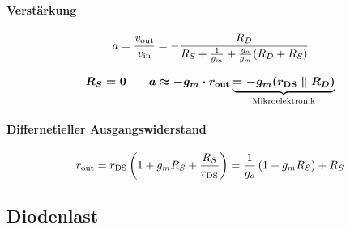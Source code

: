 \smallskip

\paragraph{Verstärkung}

\[
    a = \frac{v_{\rm out}}{v_{\rm in}} = - \frac{R_D}{R_S + \frac{1}{g_m} + \frac{g_o}{g_m}(R_D + R_S)} 
\]

\[
    \boldsymbol{ R_S = 0 \qquad  a \approx - g_m \cdot r_{\rm out} \underbrace{= - g_m (r_{\rm DS} \parallel R_D) }_{\text{Mikroelektronik}} }
\]


\paragraph{Differnetieller Ausgangswiderstand}

\vspace{-0.2cm}

\[
    r_{\rm out} = r_{\rm DS} \left( 1 + g_m R_S + \frac{R_S}{r_{\rm DS}} \right) = \frac{1}{g_o} \left( 1 + g_m R_S \right) + R_S
\]


\subsection{Diodenlast}

